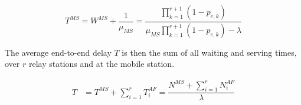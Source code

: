 \begin{equation}
  T^{MS} = W^{MS} + \dfrac{1}{\mu_{MS}} =
  \dfrac{\prod\limits_{k=1}^{r+1} (1 - p_{e,k})}{\mu_{MS}\prod\limits_{k=1}^{r+1} (1 - p_{e,k}) -\lambda}
  \label{eq:01_10}
\end{equation}

The average end-to-end delay $T$ is then the sum of all waiting and serving times,
over $r$ relay stations and at the mobile station.

\begin{align*}
  T &= T^{MS} + \sum\limits_{i=1}^r T_i^{AF} = \dfrac{N^{MS} + \sum\limits_{i=1}^r N_i^{AF}}{\lambda}
\end{align*}
